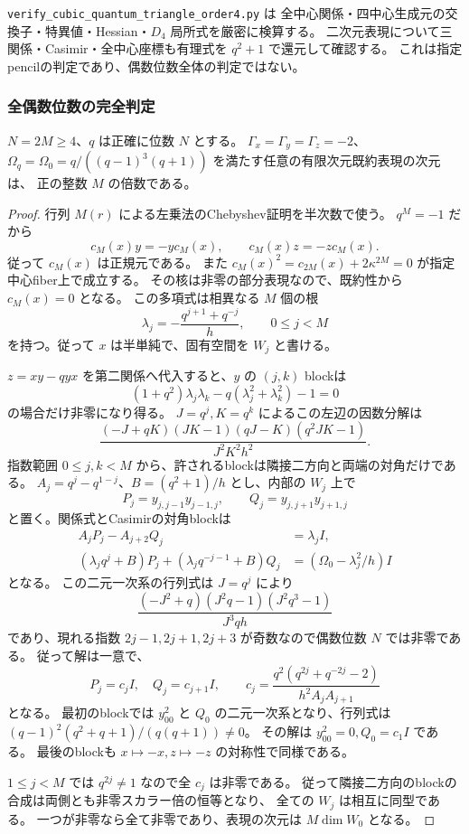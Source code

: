 \texttt{verify\_cubic\_quantum\_triangle\_\allowbreak order4.py} は
全中心関係・四中心生成元の交換子・特異値・Hessian・$D_4$ 局所式を厳密に検算する。
二次元表現について三関係・Casimir・全中心座標も有理式を $q^2+1$ で還元して確認する。
これは指定pencilの判定であり、偶数位数全体の判定ではない。

\subsubsection{全偶数位数の完全判定}
\begin{lemma}[偶数端点の半Chebyshev正規元とsimple次元]
\label{lem:quantum-triangle-even-endpoint}
$N=2M\ge4$、$q$ は正確に位数 $N$ とする。
$\Gamma_x=\Gamma_y=\Gamma_z=-2$、
$\Omega_q=\Omega_0=q/((q-1)^3(q+1))$ を満たす任意の有限次元既約表現の次元は、
正の整数 $M$ の倍数である。
\end{lemma}
\begin{proof}
行列 $M(r)$ による左乗法のChebyshev証明を半次数で使う。
$q^M=-1$ だから
\[
 c_M(x)y=-yc_M(x),\qquad c_M(x)z=-zc_M(x).
\]
従って $c_M(x)$ は正規元である。
また $c_M(x)^2=c_{2M}(x)+2\kappa^{2M}=0$ が指定中心fiber上で成立する。
その核は非零の部分表現なので、既約性から $c_M(x)=0$ となる。
この多項式は相異なる $M$ 個の根
\[
 \lambda_j=-\frac{q^{j+1}+q^{-j}}h,\qquad 0\le j<M
\]
を持つ。従って $x$ は半単純で、固有空間を $W_j$ と書ける。

$z=xy-qyx$ を第二関係へ代入すると、$y$ の $(j,k)$ blockは
\[
 (1+q^2)\lambda_j\lambda_k-q(\lambda_j^2+\lambda_k^2)-1=0
\]
の場合だけ非零になり得る。
$J=q^j,K=q^k$ によるこの左辺の因数分解は
\[
 \frac{(-J+qK)(JK-1)(qJ-K)(q^2JK-1)}{J^2K^2h^2}.
\]
指数範囲 $0\le j,k<M$ から、許されるblockは隣接二方向と両端の対角だけである。
$A_j=q^j-q^{1-j}$、$B=(q^2+1)/h$ とし、内部の $W_j$ 上で
\[
 P_j=y_{j,j-1}y_{j-1,j},\qquad Q_j=y_{j,j+1}y_{j+1,j}
\]
と置く。関係式とCasimirの対角blockは
\[
 \begin{aligned}
 A_jP_j-A_{j+2}Q_j&=\lambda_j I,\\
 (\lambda_jq^j+B)P_j+(\lambda_jq^{-j-1}+B)Q_j
   &=(\Omega_0-\lambda_j^2/h)I
 \end{aligned}
\]
となる。
この二元一次系の行列式は $J=q^j$ により
\[
 \frac{(-J^2+q)(J^2q-1)(J^2q^3-1)}{J^3qh}
\]
であり、現れる指数 $2j-1,2j+1,2j+3$ が奇数なので偶数位数 $N$ では非零である。
従って解は一意で、
\[
 P_j=c_jI,\quad Q_j=c_{j+1}I,\qquad
 c_j=\frac{q^2(q^{2j}+q^{-2j}-2)}{h^2A_jA_{j+1}}
\]
となる。
最初のblockでは $y_{00}^2$ と $Q_0$ の二元一次系となり、行列式は
$(q-1)^2(q^2+q+1)/(q(q+1))\ne0$。
その解は $y_{00}^2=0,Q_0=c_1I$ である。
最後のblockも $x\mapsto-x,z\mapsto-z$ の対称性で同様である。

$1\le j<M$ では $q^{2j}\ne1$ なので全 $c_j$ は非零である。
従って隣接二方向のblockの合成は両側とも非零スカラー倍の恒等となり、
全ての $W_j$ は相互に同型である。
一つが非零なら全て非零であり、表現の次元は $M\dim W_0$ となる。
\end{proof}

